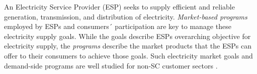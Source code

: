 %
%
%
\label{sub:EPP}
An Electricity Service Provider (ESP) seeks to supply efficient and reliable generation, transmission, and distribution of electricity. \emph{Market-based programs} employed by ESPs and consumers´ participation are key to manage these electricity supply goals. While the goals describe ESPs overarching objective for electricity supply, the \textit{programs} describe the market products that the ESPs can offer to their consumers to achieve those goals. Such electricity market goals and demand-side programs are well studied for non-SC customer sectors \cite{Palensky2011}. 

